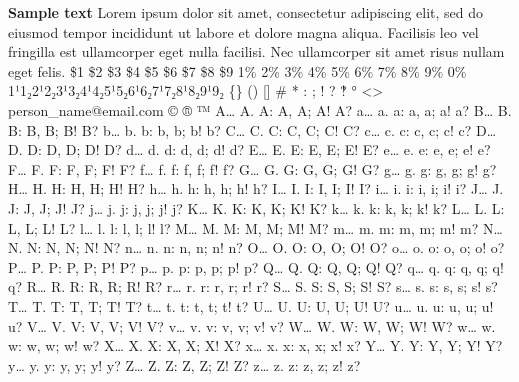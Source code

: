 \textbf{Sample text}
\ttfamily \break Lorem ipsum dolor sit amet, consectetur adipiscing elit, sed do eiusmod tempor incididunt ut labore et dolore magna aliqua. Facilisis leo vel fringilla est ullamcorper eget nulla facilisi. Nec ullamcorper sit amet risus nullam eget felis.
\break \$1 \$2 \$3 \$4 \$5 \$6 \$7 \$8 \$9 1\% 2\% 3\% 4\% 5\% 6\% 7\% 8\% 9\% 0\%
\break 1¹1₂2¹2₂3¹3₂4¹4₂5¹5₂6¹6₂7¹7₂8¹8₂9¹9₂
\break \{\} () [] \# * : ; ! ? ‽ ° <> person\_name@email.com © ® ™
\break A… A. A: A, A; A! A? a… a. a: a, a; a! a?
\break B… B. B: B, B; B! B? b… b. b: b, b; b! b?
\break C… C. C: C, C; C! C? c… c. c: c, c; c! c?
\break D… D. D: D, D; D! D? d… d. d: d, d; d! d?
\break E… E. E: E, E; E! E? e… e. e: e, e; e! e?
\break F… F. F: F, F; F! F? f… f. f: f, f; f! f?
\break G… G. G: G, G; G! G? g… g. g: g, g; g! g?
\break H… H. H: H, H; H! H? h… h. h: h, h; h! h?
\break I… I. I: I, I; I! I? i… i. i: i, i; i! i?
\break J… J. J: J, J; J! J? j… j. j: j, j; j! j?
\break K… K. K: K, K; K! K? k… k. k: k, k; k! k?
\break L… L. L: L, L; L! L? l… l. l: l, l; l! l?
\break M… M. M: M, M; M! M? m… m. m: m, m; m! m?
\break N… N. N: N, N; N! N? n… n. n: n, n; n! n?
\break O… O. O: O, O; O! O? o… o. o: o, o; o! o?
\break P… P. P: P, P; P! P? p… p. p: p, p; p! p?
\break Q… Q. Q: Q, Q; Q! Q? q… q. q: q, q; q! q?
\break R… R. R: R, R; R! R? r… r. r: r, r; r! r?
\break S… S. S: S, S; S! S? s… s. s: s, s; s! s?
\break T… T. T: T, T; T! T? t… t. t: t, t; t! t?
\break U… U. U: U, U; U! U? u… u. u: u, u; u! u?
\break V… V. V: V, V; V! V? v… v. v: v, v; v! v?
\break W… W. W: W, W; W! W? w… w. w: w, w; w! w?
\break X… X. X: X, X; X! X? x… x. x: x, x; x! x?
\break Y… Y. Y: Y, Y; Y! Y? y… y. y: y, y; y! y?
\break Z… Z. Z: Z, Z; Z! Z? z… z. z: z, z; z! z?
